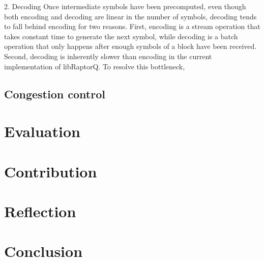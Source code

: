 \documentclass{sig-alternate-10pt}
\begin{document}
2. Decoding
Once intermediate symbols have been precomputed, even though both encoding and decoding are linear in the number of symbols, decoding tends to fall behind encoding for two reasons. First, encoding is a stream operation that takes constant time to generate the next symbol, while decoding is a batch operation that only happens after enough symbols of a block have been received. Second, decoding is inherently slower than encoding in the current implementation of libRaptorQ. To resolve this bottleneck, 
\subsection{Congestion control}

\section{Evaluation}

\section{Contribution}

\section{Reflection}

\section{Conclusion}




\end{document}
